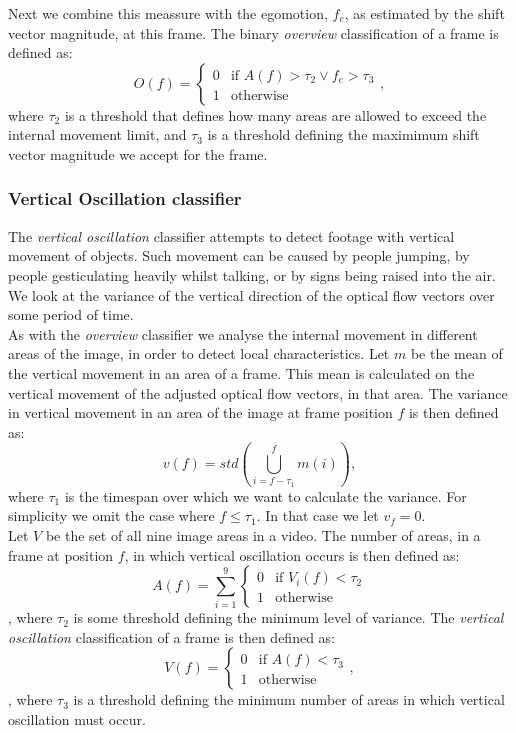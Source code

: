  Next we combine this meassure with the egomotion, $f_{e}$, as estimated by the shift vector magnitude, at this frame. The binary \textit{overview} classification of a frame is defined as:
\begin{equation}
O(f) =
\begin{cases}
0 & \text{if } A(f) > \tau_{2} \vee f_{e} > \tau_{3} \\
1 &  \text{otherwise}
\end{cases},
\end{equation}
where $\tau_{2}$ is a threshold that defines how many areas are allowed to exceed the internal movement limit, and $\tau_{3}$ is a threshold defining the maximimum shift vector magnitude we accept for the frame.
%
\subsubsection{Vertical Oscillation classifier}\label{sec:verticaloscillationclassifier}
%
The \textit{vertical oscillation} classifier attempts to detect footage with vertical movement of objects. Such movement can be caused by people jumping, by people gesticulating heavily whilst talking, or by signs being raised into the air. We look at the variance of the vertical direction of the optical flow vectors over some period of time.\\
As with the \textit{overview} classifier we analyse the internal movement in different areas of the image, in order to detect local characteristics. Let $m$ be the mean of the vertical movement in an area of a frame. This mean is calculated on the vertical movement of the adjusted optical flow vectors, in that area. The variance in vertical movement in an area of the image at frame position $f$ is then defined as:
%
\begin{equation}
v(f) = std \left (\bigcup_{i=f-\tau_1}^{f} m(i) \right ),
\end{equation}
%
where $\tau_1$ is the timespan over which we want to calculate the variance. For simplicity we omit the case where $f \leq \tau_1$. In that case we let $v_{f} = 0$.\\
Let $V$ be the set of all nine image areas in a video. The number of areas, in a frame at position $f$, in which vertical oscillation occurs is then defined as:
%
\begin{equation}
A(f) = \sum_{i=1}^{9}
\begin{cases}
0 & \text{if } V_{i}(f) < \tau_2\\
1 &  \text{otherwise}
\end{cases}
\end{equation},
%
where $\tau_2$ is some threshold defining the minimum level of variance. The \textit{vertical oscillation} classification of a frame is then defined as:
%
\begin{equation}
V(f) =
\begin{cases}
0 & \text{if } A(f) < \tau_3\\
1 &  \text{otherwise}
\end{cases},
\end{equation},
%
where $\tau_3$ is a threshold defining the minimum number of areas in which vertical oscillation must occur.
%
%
